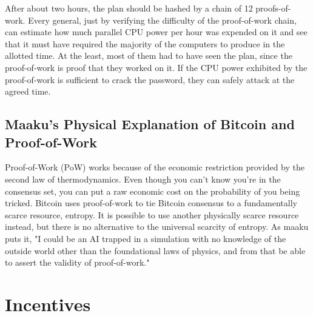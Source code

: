 \documentclass[letterpaper]{article}
\begin{document}
After about two hours, the plan should be hashed by a chain of 12
proofs-of-work. Every general, just by verifying the difficulty of the
proof-of-work chain, can estimate how much parallel CPU power per hour was
expended on it and see that it must have required the majority of the computers
to produce in the allotted time. At the least, most of them had to have seen
the plan, since the proof-of-work is proof that they worked on it. If the CPU
power exhibited by the proof-of-work is sufficient to crack the password, they
can safely attack at the agreed time.

\subsection{Maaku's Physical Explanation of Bitcoin and Proof-of-Work}

Proof-of-Work (PoW) works because of the economic restriction provided by the second
law of thermodynamics. Even though you can't know you're in the consensus set,
you can put a raw economic cost on the probability of you being tricked.
Bitcoin uses proof-of-work to tie Bitcoin consensus to a fundamentally scarce
resource, entropy. It is possible to use another physically scarce resource
instead, but there is no alternative to the universal scarcity of entropy. As
maaku puts it, "I could be an AI trapped in a simulation with no knowledge of
the outside world other than the foundational laws of physics, and from that be
able to assert the validity of proof-of-work."

\section{Incentives}
\end{document}
